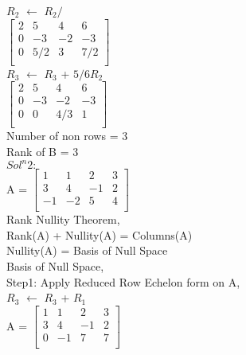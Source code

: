 \documentclass{article}
\begin{document}
$R_2$ $\leftarrow$ $R_2/$\\

$\begin{bmatrix}
    2 & 5 & 4 & 6\\
    0 & -3 & -2 & -3\\
    0 & 5/2 & 3 & 7/2 \\
    \end{bmatrix}$ \\
    
$R_3$ $\leftarrow$ $R_3$ + $5/6R_2$\\

$\begin{bmatrix}
    2 & 5 & 4 & 6\\
    0 & -3 & -2 & -3\\
    0 & 0 & 4/3 & 1 \\
    \end{bmatrix}$ \\
    
 Number of non rows = 3   \\
 
Rank of B = 3 \\

$Sol^n 2:$ \\

A = $\begin{bmatrix}
    1 & 1 & 2 & 3\\
    3 & 4 & -1 & 2\\
    -1 & -2 & 5 & 4 \\
    \end{bmatrix}$ \\
    
Rank Nullity Theorem, \\

Rank(A) + Nullity(A) = Columns(A) \\

Nullity(A) = Basis of Null Space \\

Basis of Null Space, \\

Step1: Apply Reduced Row Echelon form on A, \\

$R_3$ $\leftarrow$ $R_3$ + $R_1$\\

A = $\begin{bmatrix}
    1 & 1 & 2 & 3\\
    3 & 4 & -1 & 2\\
    0 & -1 & 7 & 7 \\
    \end{bmatrix}$ \\
\end{document}
